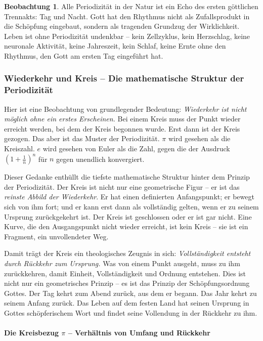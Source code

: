 ﻿\documentclass[a4paper,12pt]{article}
\theoremstyle{definition}
\newtheorem{observation}{Beobachtung}[section]
\begin{document}
\begin{observation}
	Alle Periodizität in der Natur ist ein Echo des ersten göttlichen Trennakts:
	Tag und Nacht. Gott hat den Rhythmus nicht als Zufallsprodukt in die Schöpfung
	eingebaut, sondern als tragenden Grundzug der Wirklichkeit. Leben ist ohne
	Periodizität undenkbar -- kein Zellzyklus, kein Herzschlag, keine neuronale
	Aktivität, keine Jahreszeit, kein Schlaf, keine Ernte ohne den Rhythmus, den
	Gott am ersten Tag eingeführt hat.
\end{observation}

\subsubsection{Wiederkehr und Kreis -- Die mathematische Struktur der Periodizität}

Hier ist eine Beobachtung von grundlegender Bedeutung: \textit{Wiederkehr ist
	nicht möglich ohne ein erstes Erscheinen.} Bei einem Kreis muss der Punkt wieder
erreicht werden, bei dem der Kreis begonnen wurde. Erst dann ist der Kreis gezogen.
Das aber ist das Muster der Periodizität. $\pi$ wird gesehen als die Kreiszahl. $e$ wird gesehen von Euler als die Zahl, gegen die der Ausdruck $\left(1 + \frac{1}{n}\right)^n$ für $n $ gegen unendlich konvergiert.

Dieser Gedanke enthüllt die tiefste mathematische Struktur hinter dem Prinzip der
Periodizität. Der Kreis ist nicht nur eine geometrische Figur -- er ist das
\textit{reinste Abbild der Wiederkehr}. Er hat einen definierten Anfangspunkt;
er bewegt sich von ihm fort; und er kann erst dann als vollständig gelten, wenn
er zu seinem Ursprung zurückgekehrt ist. Der Kreis ist geschlossen oder er ist
gar nicht. Eine Kurve, die den Ausgangspunkt nicht wieder erreicht, ist kein
Kreis -- sie ist ein Fragment, ein unvollendeter Weg.

Damit trägt der Kreis ein theologisches Zeugnis in sich: \textit{Vollständigkeit
	entsteht durch Rückkehr zum Ursprung.} Was von einem Punkt ausgeht, muss zu ihm
zurückkehren, damit Einheit, Vollständigkeit und Ordnung entstehen. Dies ist nicht
nur ein geometrisches Prinzip -- es ist das Prinzip der Schöpfungsordnung Gottes.
Der Tag kehrt zum Abend zurück, aus dem er begann. Das Jahr kehrt zu seinem Anfang
zurück. Das Leben auf dem festen Land hat seinen Ursprung in Gottes schöpferischem
Wort und findet seine Vollendung in der Rückkehr zu ihm.

\paragraph{Die Kreisbezug $\pi$ -- Verhältnis von Umfang und Rückkehr}
\end{document}
